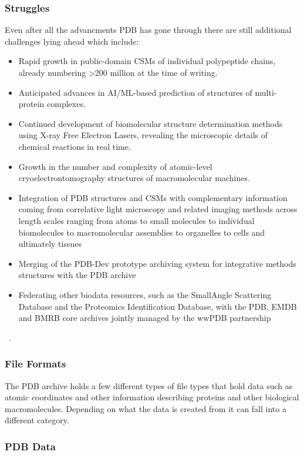\documentclass[]{final_report}
\begin{document}
\subsubsection{Struggles}
Even after all the advancments PDB has gone through there are still additional challenges lying ahead which include:

\begin{itemize}
    \item Rapid growth in public-domain CSMs of individual polypeptide chains, already numbering >200 million at the time of writing.
    \item Anticipated advances in AI/ML-based prediction of structures of multi-protein complexes.
    \item Continued development of biomolecular structure determination methods using X-ray Free Electron Lasers, revealing the microscopic details of chemical reactions in real time.
    \item Growth in the number and complexity of atomic-level cryoelectrontomography structures of macromolecular machines.
    \item Integration of PDB structures and CSMs with complementary information coming from correlative light microscopy and related imaging methods across length scales ranging from atoms to small molecules to individual biomolecules to macromolecular assemblies to organelles to cells and ultimately tissues
    \item Merging of the PDB-Dev prototype archiving system for integrative methods structures with the PDB archive
    \item Federating other biodata resources, such as the SmallAngle Scattering Database and the Proteomics Identification Database, with the PDB, EMDB and BMRB core archives jointly managed by the wwPDB partnership
\end{itemize}
~\cite{burley1_rcsb_2022}.

\clearpage

\subsubsection{File Formats}

The PDB archive holds a few different types of file types that hold data such as atomic coordinates and other information describing proteins and other biological macromolecules. Depending on what the data is created from it can fall into a different category.

\subsubsection{PDB Data}
\end{document}
